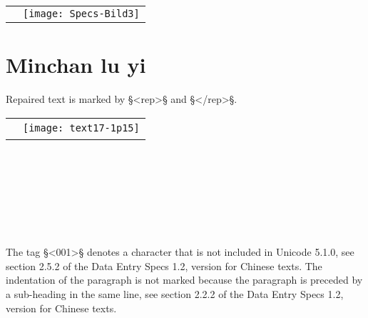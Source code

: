 \documentclass[fontsize=11pt, paper=a4, 
DIV15,
normalheadings,
parskip=half-, 
pointlessnumbers]{scrartcl}
\begin{document}
\begin{tabular}{@{}ll}
\parbox[b]{125mm}{
 \\[17mm]
\begin{typeChinese}
\bold{\{}\bold{\}[}\bold{]} \\
\bold{[(}\bold{)]}\bold{[}\bold{]} \\
\bold{\{}\bold{\}[}\bold{]\{}\bold{\}[}\bold{]} \\[12mm]
\end{typeChinese}
} & \qquad
\texttt{[image: Specs-Bild3]}
\end{tabular}

\newpage

\section{Minchan lu yi \, }


\begin{mainrule}
Repaired text is marked by §<rep>§ and §</rep>§.
\end{mainrule}

\begin{tabular}{@{}ll}
\parbox[b]{123mm}{
 \\[105mm]
} & 
\texttt{[image: text17-1p15]}
\end{tabular}

\begin{typeChinese}
\someText \\
 \\
\bold{\bs\bs} \\
\chin{　} \\
 \\
 \\
\end{typeChinese}

\begin{crossref}
The tag §<001>§ denotes a character that is not included in Unicode 5.1.0, see section 2.5.2 of the Data Entry Specs 1.2, version for Chinese texts.
The indentation of the paragraph is not marked because the paragraph is preceded by a sub-heading in the same line, see section 2.2.2 of the Data Entry Specs 1.2, version for Chinese texts.
\end{crossref}
\end{document}
